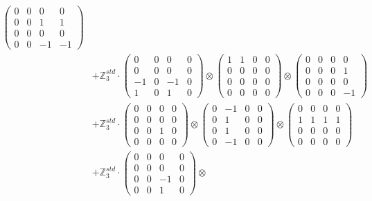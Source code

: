 \documentclass{article}
\begin{document}
{\begin{align}
            \begin{pmatrix} 0 & 0 & 0 & 0 \\ 0 & 0 & 1 & 1 \\ 0 & 0 & 0 & 0 \\ 0 & 0 & -1 & -1 \end{pmatrix} \\ 
        &+ \label{Rs1-Rc16-Strassen-1-c15} \mathbb{Z}_3^{std} \cdot 
            \begin{pmatrix} 0 & 0 & 0 & 0 \\ 0 & 0 & 0 & 0 \\ -1 & 0 & -1 & 0 \\ 1 & 0 & 1 & 0 \end{pmatrix} \otimes 
            \begin{pmatrix} 1 & 1 & 0 & 0 \\ 0 & 0 & 0 & 0 \\ 0 & 0 & 0 & 0 \\ 0 & 0 & 0 & 0 \end{pmatrix} \otimes 
            \begin{pmatrix} 0 & 0 & 0 & 0 \\ 0 & 0 & 0 & 1 \\ 0 & 0 & 0 & 0 \\ 0 & 0 & 0 & -1 \end{pmatrix} \\ 
        &+ \label{Rs1-Rc16-Strassen-1-c16} \mathbb{Z}_3^{std} \cdot 
            \begin{pmatrix} 0 & 0 & 0 & 0 \\ 0 & 0 & 0 & 0 \\ 0 & 0 & 1 & 0 \\ 0 & 0 & 0 & 0 \end{pmatrix} \otimes 
            \begin{pmatrix} 0 & -1 & 0 & 0 \\ 0 & 1 & 0 & 0 \\ 0 & 1 & 0 & 0 \\ 0 & -1 & 0 & 0 \end{pmatrix} \otimes 
            \begin{pmatrix} 0 & 0 & 0 & 0 \\ 1 & 1 & 1 & 1 \\ 0 & 0 & 0 & 0 \\ 0 & 0 & 0 & 0 \end{pmatrix} \\ 
        &+ \label{Rs1-Rc16-Strassen-1-c17} \mathbb{Z}_3^{std} \cdot 
            \begin{pmatrix} 0 & 0 & 0 & 0 \\ 0 & 0 & 0 & 0 \\ 0 & 0 & -1 & 0 \\ 0 & 0 & 1 & 0 \end{pmatrix} \otimes 

\end{align}}
\end{document}
